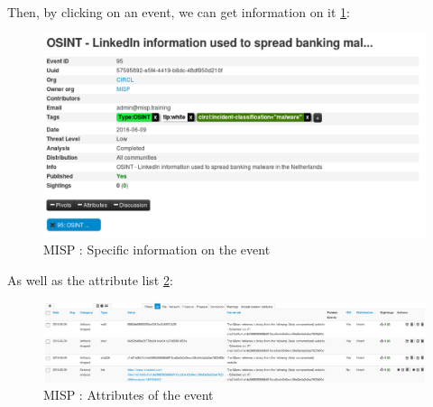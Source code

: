 \documentclass{eplmastersthesis}
\begin{document}
Then, by clicking on an event, we can get information on it \ref{webevent}:


\begin{figure}[!h]
	\begin{center}
		\includegraphics[scale=0.35]{res/webEvent}
		\caption{MISP : Specific information on the event}
		\label{webevent}
	\end{center}
\end{figure}


As well as the attribute list \ref{webattributes}:
\begin{figure}[!h]
	\begin{center}
		\includegraphics[scale=0.35]{res/webAttributes}
		\caption{MISP : Attributes of the event}
		\label{webattributes}
	\end{center}
\end{figure}
\end{document}
